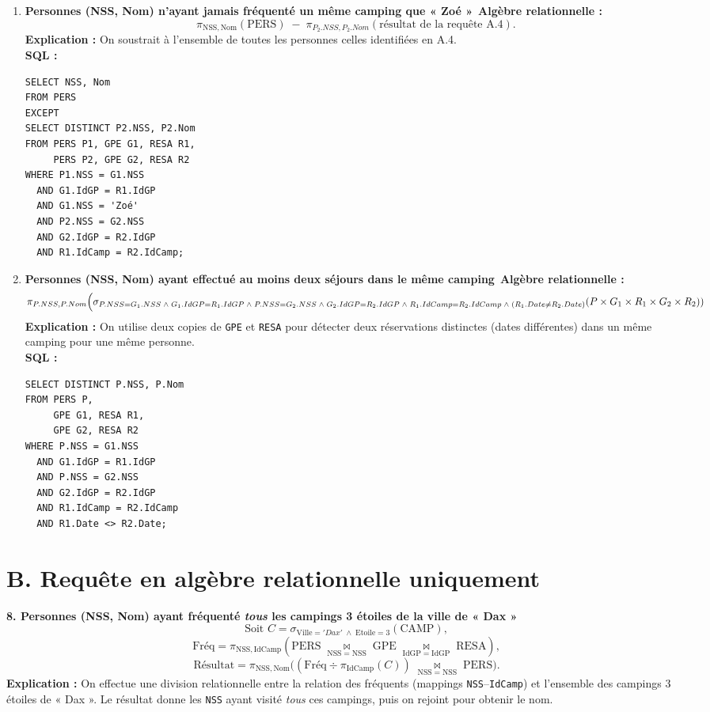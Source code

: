 \documentclass[a4paper,11pt]{article}
\begin{document}
\begin{enumerate}
  \item \textbf{Personnes (NSS, Nom) n’ayant jamais fréquenté un même camping que « Zoé »}\
    \textbf{Algèbre relationnelle :}
    \[
      \pi_{\mathrm{NSS},\mathrm{Nom}}(\mathrm{PERS})
      \;-\;
      \pi_{P_2.NSS,P_2.Nom}(\text{résultat de la requête A.4}).
    \]
    \textbf{Explication :} On soustrait à l'ensemble de toutes les personnes celles identifiées en A.4.\\
    \textbf{SQL :}
    \begin{verbatim}
SELECT NSS, Nom
FROM PERS
EXCEPT
SELECT DISTINCT P2.NSS, P2.Nom
FROM PERS P1, GPE G1, RESA R1,
     PERS P2, GPE G2, RESA R2
WHERE P1.NSS = G1.NSS
  AND G1.IdGP = R1.IdGP
  AND G1.NSS = 'Zoé'
  AND P2.NSS = G2.NSS
  AND G2.IdGP = R2.IdGP
  AND R1.IdCamp = R2.IdCamp;
    \end{verbatim}

  \item \textbf{Personnes (NSS, Nom) ayant effectué au moins deux séjours dans le même camping}\
    \textbf{Algèbre relationnelle :}
    \[
      \pi_{P.NSS,P.Nom}\Bigl(\sigma_{
        P.NSS=G_1.NSS\;\wedge\;G_1.IdGP=R_1.IdGP
        \;\wedge\;P.NSS=G_2.NSS\;\wedge\;G_2.IdGP=R_2.IdGP
        \;\wedge\;R_1.IdCamp=R_2.IdCamp
        \;\wedge\;(R_1.Date\neq R_2.Date)
      }(P \times G_1 \times R_1 \times G_2 \times R_2))
    \]
    \textbf{Explication :} On utilise deux copies de \texttt{GPE} et \texttt{RESA} pour détecter deux réservations distinctes (dates différentes) dans un même camping pour une même personne.\\
    \textbf{SQL :}
    \begin{verbatim}
SELECT DISTINCT P.NSS, P.Nom
FROM PERS P,
     GPE G1, RESA R1,
     GPE G2, RESA R2
WHERE P.NSS = G1.NSS
  AND G1.IdGP = R1.IdGP
  AND P.NSS = G2.NSS
  AND G2.IdGP = R2.IdGP
  AND R1.IdCamp = R2.IdCamp
  AND R1.Date <> R2.Date;
    \end{verbatim}
\end{enumerate}

\section*{B. Requête en algèbre relationnelle uniquement}
\textbf{8. Personnes (NSS, Nom) ayant fréquenté \emph{tous} les campings 3 étoiles de la ville de « Dax »}\
\[
  \text{Soit }C = \sigma_{\mathrm{Ville}='Dax'\;\wedge\;\mathrm{Etoile}=3}(\mathrm{CAMP}),
\]
\[
  \text{Fréq} = \pi_{\mathrm{NSS},\mathrm{IdCamp}}(\mathrm{PERS}\;
      \underset{\mathrm{NSS}=\mathrm{NSS}}{\bowtie}\;
      \mathrm{GPE}\;
      \underset{\mathrm{IdGP}=\mathrm{IdGP}}{\bowtie}\;
      \mathrm{RESA}),
\]
\[
  \text{Résultat} = \pi_{\mathrm{NSS},\mathrm{Nom}}\bigl((\text{Fréq}\div\pi_{\mathrm{IdCamp}}(C))\;
      \underset{\mathrm{NSS}=\mathrm{NSS}}{\bowtie}\;
      \mathrm{PERS}\bigr).
\]
\textbf{Explication :} On effectue une division relationnelle entre la relation des fréquents (mappings \texttt{NSS}–\texttt{IdCamp}) et l'ensemble des campings 3 étoiles de « Dax ». Le résultat donne les \texttt{NSS} ayant visité \emph{tous} ces campings, puis on rejoint pour obtenir le nom.\\
\end{document}
